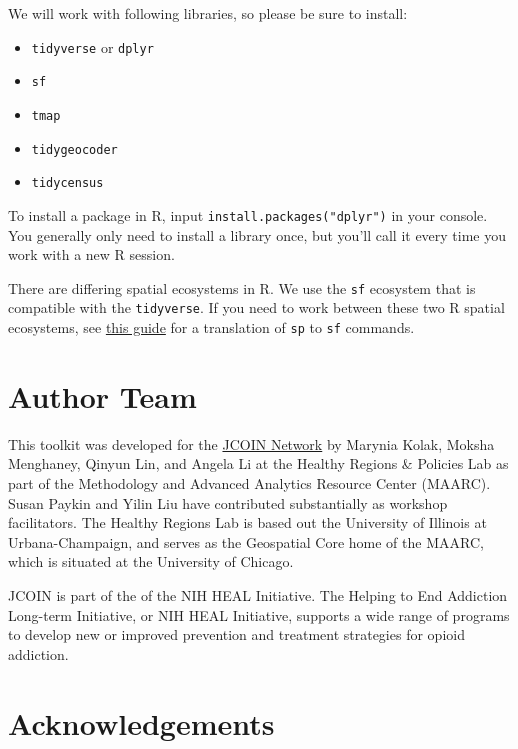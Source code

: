 \documentclass[
  letterpaper,
  DIV=11,
  numbers=noendperiod]{scrreprt}
\providecommand{\tightlist}{%
  \setlength{\itemsep}{0pt}\setlength{\parskip}{0pt}}
\begin{document}
We will work with following libraries, so please be sure to install:

\begin{itemize}
\tightlist
\item
  \texttt{tidyverse} or \texttt{dplyr}
\item
  \texttt{sf}
\item
  \texttt{tmap}
\item
  \texttt{tidygeocoder}
\item
  \texttt{tidycensus}
\end{itemize}

To install a package in R, input \texttt{install.packages("dplyr")} in
your console. You generally only need to install a library once, but
you'll call it every time you work with a new R session.

There are differing spatial ecosystems in R. We use the \texttt{sf}
ecosystem that is compatible with the \texttt{tidyverse}. If you need to
work between these two R spatial ecosystems, see
\href{https://github.com/r-spatial/sf/wiki/Migrating}{this guide} for a
translation of \texttt{sp} to \texttt{sf} commands.

\section*{Author Team}\label{author-team}


This toolkit was developed for the
\href{https://heal.nih.gov/research/research-to-practice/jcoin}{JCOIN
Network} by Marynia Kolak, Moksha Menghaney, Qinyun Lin, and Angela Li
at the Healthy Regions \& Policies Lab as part of the Methodology and
Advanced Analytics Resource Center (MAARC). Susan Paykin and Yilin Liu
have contributed substantially as workshop facilitators. The Healthy
Regions Lab is based out the University of Illinois at Urbana-Champaign,
and serves as the Geospatial Core home of the MAARC, which is situated
at the University of Chicago.

JCOIN is part of the of the NIH HEAL Initiative. The Helping to End
Addiction Long-term Initiative, or NIH HEAL Initiative, supports a wide
range of programs to develop new or improved prevention and treatment
strategies for opioid addiction.

\section*{Acknowledgements}\label{acknowledgements}
\end{document}
